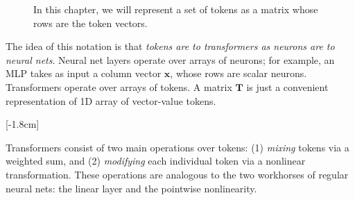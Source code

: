 \begin{figure}
{
    }
    \caption{In this chapter, we will represent a set of tokens as a matrix whose rows are the token vectors.}
    \label{fig:transformers:T_notation}
\end{figure}
\vspace{-0.4cm}

The idea of this notation is that \textit{tokens are to transformers as neurons are to neural nets}. Neural net layers operate over arrays of neurons; for example, an MLP takes as input a column vector $\mathbf{x}$, whose rows are scalar neurons. Transformers operate over arrays of tokens. A matrix $\mathbf{T}$ is just a convenient representation of 1D array of vector-value tokens.

[-1.8cm]

Transformers consist of two main operations over tokens: (1) \textit{mixing} tokens via a weighted sum, and (2) \textit{modifying} each individual token via a nonlinear transformation. These operations are analogous to the two workhorses of regular neural nets: the linear layer and the pointwise nonlinearity. %

